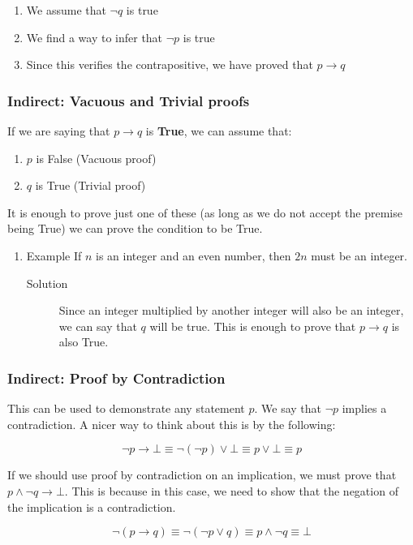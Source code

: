 \documentclass[11pt]{article}
\begin{document}
\begin{enumerate}
\item We assume that \(\neg q\) is true
\item We find a way to infer that \(\neg p\) is true
\item Since this verifies the contrapositive, we have proved that \(p \to q\)
\end{enumerate}

\subsubsection{Indirect: Vacuous and Trivial proofs}
\label{sec:org7db5df7}
If we are saying that \(p \to q\) is \textbf{True}, we can assume that:
\begin{enumerate}
\item \(p\) is False (Vacuous proof)
\item \(q\) is True (Trivial proof)
\end{enumerate}

It is enough to prove just one of these (as long as we do not accept the premise being True) we can prove the condition to be True.
\begin{enumerate}
\item Example
\label{sec:orgc924fd8}
If \(n\) is an integer and an even number, then \(2n\) must be an integer.
\begin{description}
\item[{Solution}] Since an integer multiplied by another integer will also be an integer, we can say that \(q\) will be true. This is enough to prove that \(p \to q\) is also True.
\end{description}
\end{enumerate}
\subsubsection{Indirect: Proof by Contradiction}
\label{sec:org6c10e9d}
This can be used to demonstrate any statement \(p\). We say that \(\neg p\) implies a contradiction. A nicer way to think about this is by the following:

\[
\neg p \to \bot \equiv \neg (\neg p) \lor \bot \equiv p \lor \bot \equiv p
\]

If we should use proof by contradiction on an implication, we must prove that \(p \land \neg q \to \bot\). This is because in this case, we need to show that the negation of the implication is a contradiction.

\[
\neg (p \to q) \equiv \neg (\neg p \lor q) \equiv p \land \neg q \equiv \bot
\]
\end{document}
